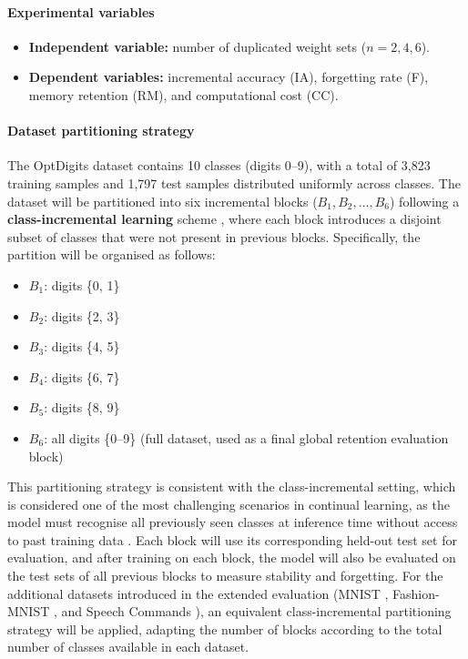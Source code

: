 \paragraph{Experimental variables}
\begin{itemize}
    \item \textbf{Independent variable:} number of duplicated weight sets 
    (\(n = 2, 4, 6\)).
    \item \textbf{Dependent variables:} incremental accuracy (IA), forgetting rate (F), 
    memory retention (RM), and computational cost (CC).
\end{itemize}

\paragraph{Dataset partitioning strategy}
The OptDigits dataset contains 10 classes (digits 0--9), with a total of 3,823 training 
samples and 1,797 test samples distributed uniformly across classes. The dataset will be 
partitioned into six incremental blocks ($B_1, B_2, \ldots, B_6$) following a 
\textbf{class-incremental learning} scheme \cite{de2021continual}, where each block 
introduces a disjoint subset of classes that were not present in previous blocks. 
Specifically, the partition will be organised as follows:

\begin{itemize}
    \item $B_1$: digits \{0, 1\}
    \item $B_2$: digits \{2, 3\}
    \item $B_3$: digits \{4, 5\}
    \item $B_4$: digits \{6, 7\}
    \item $B_5$: digits \{8, 9\}
    \item $B_6$: all digits \{0--9\} (full dataset, used as a final global 
    retention evaluation block)
\end{itemize}

This partitioning strategy is consistent with the class-incremental setting, which is 
considered one of the most challenging scenarios in continual learning, as the model 
must recognise all previously seen classes at inference time without access to past 
training data \cite{de2021continual, rebuffi2017icarl}. Each block will use its 
corresponding held-out test set for evaluation, and after training on each block, the 
model will also be evaluated on the test sets of all previous blocks to measure 
stability and forgetting. For the additional datasets introduced in the extended 
evaluation (MNIST \cite{lecun1998mnist}, Fashion-MNIST \cite{xiao2017fashionmnist}, 
and Speech Commands \cite{warden2018speech}), an equivalent class-incremental 
partitioning strategy will be applied, adapting the number of blocks according to 
the total number of classes available in each dataset.

